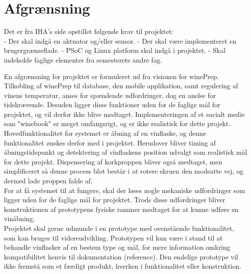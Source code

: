 \chapter{Afgrænsning}
Det er fra IHA's side opstillet følgende krav til projektet:\\
- Der skal indgå en aktuator og/eller sensor.
- Der skal være implementeret en brugergrænseflade.
- PSoC og Linux platform skal indgå i projektet.
- Skal indeholde faglige elementer fra semesterets andre fag.

En afgrænsning for projektet er formuleret ud fra visionen for winePrep. Tilkobling af winePrep til database, den mobile applikation, samt regulering af vinens 
temperatur, anses for spændende udfordringer, dog en anelse for tidskrævende. Desuden ligger disse funktioner uden for de faglige mål for projektet, og vil 
derfor ikke blive medtaget. Implementeringen af et socialt medie som "winebook" er meget omfangsrigt, og er ikke realistisk for dette projekt.\\

Hovedfunktionalitet for systemet er åbning af en vinflaske, og denne funktionalitet ønskes derfor med i projektet. Herudover bliver timing af åbningstidspunkt 
og detektering af vinflaskens position udvalgt som realistisk mål for dette projekt. Dispensering af korkproppen bliver også medtaget, men simplificeret så denne
process blot består i at rotere skruen den modsatte vej, og dermed lade proppen falde af.\\

For at få systemet til at fungere, skal der løses nogle mekaniske udfordringer som ligger uden for de faglige mål for projektet. Trods disse udfordringer
bliver konstruktionen af prototypens fysiske rammer medtaget for at kunne udføre en vinåbning.\\

Projektet skal gerne udmunde i en prototype med ovenstående funktionalitet, som kan bruges til videreudvikling. Prototypen vil kun være i stand til at behandle 
vinflasker af en bestem type og mål, for mere information omkring kompatibilitet henvis til dokumentation (reference). Den endelige prototype vil ikke fremstå 
som et færdigt produkt, hverken i funktionalitet eller konstruktion. 

    